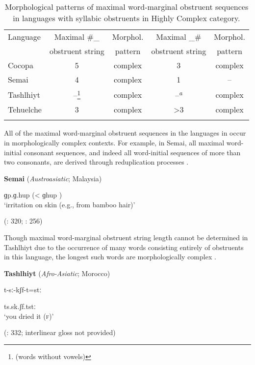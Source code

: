 \begin{table}
\begin{tabular}{lcccc}
\lsptoprule
{Language}& {Maximal \#\_} & {Morphol.} & Maximal \_\#  & Morphol. \\
          &   obstruent string     &      pattern                   &  obstruent string   &      pattern                \\\midrule
Cocopa    & 5                      & complex & 3                      & complex\\
Semai     & 4                      & complex & 1                      & --\\
Tashlhiyt & --\footnote{(words without vowels)} & complex & --\textsuperscript{\itshape a} & complex\\
Tehuelche & 3                      & complex & >3                     & complex\\
\lspbottomrule
\end{tabular}
\caption{\label{tab:3.8}Morphological patterns of maximal word-marginal obstruent sequences in languages with syllabic obstruents in Highly Complex category.}
\end{table}

  All of the maximal word-marginal obstruent sequences in the languages in  occur in morphologically complex contexts. For example, in Semai, all maximal word-initial consonant sequences, and indeed all word-initial sequences of more than two consonants, are derived through reduplication processes .

\ea\label{ex:3.23}
  \textbf{Semai} (\textit{Austroasiatic}; Malaysia)

ɡp.ɡ.hup (< ɡhup )\\
\glt ‘irritation on skin (e.g., from bamboo hair)’

(\citealt{Sloan1988}: 320; \citealt{Diffloth1976a}: 256)
\z

Though maximal word-marginal obstruent string length cannot be determined in Tashlhiyt due to the occurrence of many words consisting entirely of obstruents in this language, the longest such words are morphologically complex .

\ea\label{ex:3.24}
  \textbf{Tashlhiyt} (\textit{Afro-Asiatic}; Morocco)

t-sː-kʃf-t=stː

ts.sk.ʃf.tstː\\
\glt ‘you dried it (\textsc{f})’

(\citealt{Ridouane2008}: 332; interlinear gloss not provided)
\z

